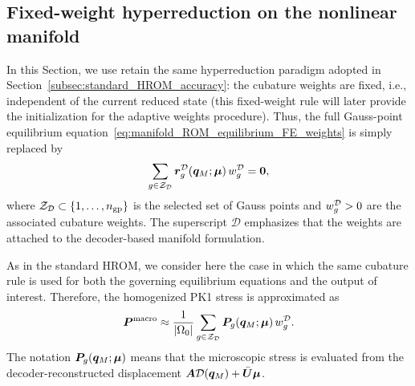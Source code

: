 \documentclass[11pt,a4paper]{article}
\begin{document}
\subsection{Fixed-weight hyperreduction on the nonlinear manifold}
\label{subsec:fixed_weight_manifold_hrom}

In this Section, we use retain the same hyperreduction paradigm adopted in Section~\ref{subsec:standard_HROM_accuracy}: the cubature weights are fixed, i.e., independent of the current reduced state  (this fixed-weight rule will later provide the initialization for the
adaptive weights procedure). Thus, the full Gauss-point equilibrium equation~\eqref{eq:manifold_ROM_equilibrium_FE_weights} is simply replaced by
\begin{equation}
\label{eq:manifold_fixed_ECM_equilibrium}
    \sum_{g\in\mathcal{Z}_{\mathcal{D}}}
    \bm{r}^{\mathcal{D}}_{g}(\bm{q}_M;\bm{\mu})\,w^{\mathcal{D}}_{g}
    =
    \bm{0},
\end{equation}
where $\mathcal{Z}_{\mathcal{D}}\subset\{1,\ldots,n_{\mathrm{gp}}\}$ is the selected set of Gauss points and
$w^{\mathcal{D}}_{g}>0$ are the associated cubature weights. The superscript
$\mathcal{D}$ emphasizes that the weights are attached to the decoder-based
manifold formulation.

As in the standard HROM, we consider here the case in which the same cubature
rule is used for both the governing equilibrium equations and the output of
interest. Therefore, the homogenized PK1 stress is approximated as
\begin{equation}
\label{eq:PKmacro_manifold_fixed_rule}
    \bm{P}^{\mathrm{macro}}
    \approx
    \frac{1}{|\Omega_0|}
    \sum_{g\in\mathcal{Z}_{\mathcal{D}}}
    \boldsymbol{P}_g(\bm{q}_M;\bm{\mu})\,w^{\mathcal{D}}_{g}.
\end{equation}
The notation $\boldsymbol{P}_g(\bm{q}_M;\bm{\mu})$ means that the microscopic stress is
evaluated from the decoder-reconstructed displacement
$\bm{A}\mathcal{\boldsymbol{D}}(\bm{q}_M)+\bar{\bm{U}}\bm{\mu}$.
\end{document}

